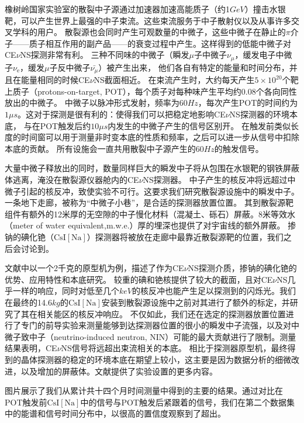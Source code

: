 \begin{translation}
橡树岭国家实验室的散裂中子源通过加速器加速高能质子（约1$\si{GeV}$）撞击水银靶，可以产生世界上最强的中子束流。这些束流服务于中子散射仪以及从事许多交叉学科的用户。
散裂源也会同时产生可观数量的中微子，这些中微子在静止的$\pi$介子——质子相互作用的副产品——的衰变过程中产生。这样得到的低能中微子对CE$\nu$NS探测非常有利。
三种不同味的中微子（瞬发$\mu$子中微子$\nu_\mu$，缓发电子中微子$\nu_\mathrm{e}$，缓发$\mu$子反中微子$\bar{\nu_\mu}$）被产生出来，
他们各自有特定的能量和时间分布，并且在能量相同的时候CE$\nu$NS截面相近。
在束流产生时，大约每天产生$5\times10^{20}$个靶上质子（protons-on-target, POT），每个质子对每种味产生平均约0.08个各向同性放出的中微子。
中微子以脉冲形式发射，频率为$60\si{Hz}$，每次产生POT的时间约为$1\mu\si{s}$。这对于探测是很有利的：使得我们可以把稳定地影响CE$\nu$NS探测器的环境本底，
与在POT触发后约$10\mu\si{s}$内发生的中微子产生的信号区别开。
在触发前类似长度的时间窗可以用于测量非时变本底的性质和频率，之后可以进一步从信号中扣除本底的贡献。
所有设施会一直共用散裂中子源产生的$60\si{Hz}$的触发信号。

大量中微子释放出的同时，数量同样巨大的瞬发中子将从包围在水银靶的钢铁屏蔽体逃离，淹没在散裂源仪器舱内的CE$\nu$NS探测器。
中子产生的核反冲将远超过中微子引起的核反冲，致使实验不可行。这要求我们研究散裂源设施中的瞬发中子。一条地下走廊，被称为``中微子小巷''，是合适的探测器放置位置。
其到散裂源靶组件有额外的12米厚的无空隙的中子慢化材料（混凝土、砾石）屏蔽。8米等效水（meter of water equivalent,m.w.e.）厚的埋深也提供了对宇宙线的额外屏蔽。
掺钠的碘化铯（$\mathrm{CsI[Na]}$）探测器将被放在走廊中最靠近散裂源靶的位置，我们之后会讨论到。

文献中以一个2千克的原型机为例，描述了作为CE$\nu$NS探测介质，掺钠的碘化铯的优势、应用特性和本底研究。
较重的碘和铯核提供了较大的截面，且对CE$\nu$NS几乎一样的响应，同时对低至几个$\si{keV}$的核反冲也能产生足以探测到的闪烁光。我们在最终的14.6$\si{kg}$的$\mathrm{CsI[Na]}$安装到散裂源设施中之前对其进行了额外的标定，并研究了其在相关能区的核反冲响应。
不仅如此，我们还在选定的探测器放置位置进行了专门的前导实验来测量能够到达探测器位置的很小的瞬发中子流强，以及对中微子致中子（neutrino-induced neutron, NIN）可能的最大贡献进行了限制。测量结果表明，CE$\nu$NS信号将远超出束流相关的本底。
相比于探测器原型机，最终得到的晶体探测器的稳定的环境本底在期望上较小，这主要是因为数据分析的细微改进，以及增加的屏蔽体。文献提供了实验设置的更多内容。

图片展示了我们从累计共十四个月时间测量中得到的主要的结果。通过对比在POT触发前$\mathrm{CsI[Na]}$中的信号与POT触发后紧跟着的信号，我们在第二个数据集中的能谱和信号时间分布中，以很高的置信度观察到了超出。




\begin{translation-index}
  \nocite{akimov_observation_2017}
  
  
\end{translation-index}

\end{translation}
